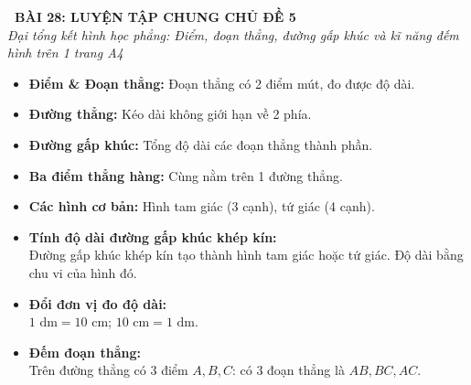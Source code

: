 \documentclass[11pt,a4paper]{article}
\begin{document}
\begin{tcolorbox}[
  enhanced,
  colback=violet!8!white,
  colframe=violet!70!black,
  arc=3mm, boxrule=1.2pt,
  left=3mm, right=3mm, top=2mm, bottom=2mm,
  halign=center
]
  {\LARGE\bfseries\color{violet!90!black}\faBookmark\ BÀI 28: LUYỆN TẬP CHUNG CHỦ ĐỀ 5}\\[1mm]
  {\itshape\footnotesize\color{black!75} Đại tổng kết hình học phẳng: Điểm, đoạn thẳng, đường gấp khúc và kĩ năng đếm hình trên 1 trang A4}
\end{tcolorbox}

\vspace{-2mm}

\noindent
\begin{minipage}[t]{0.49\textwidth}\vspace{0pt}
\begin{tcolorbox}[
  enhanced,
  colback=violet!4!white,
  colframe=violet!75!black,
  arc=2mm, boxrule=0.8pt,
  left=2mm, right=2mm, top=1.8mm, bottom=1.8mm,
  title={\footnotesize\bfseries\color{white}\faKey\ 1. Trụ cột kiến thức hình phẳng}
]
{\footnotesize
\begin{itemize}\setlength{\itemsep}{1pt}\setlength{\leftskip}{-2.5mm}
  \item \textbf{Điểm \& Đoạn thẳng:} Đoạn thẳng có 2 điểm mút, đo được độ dài.
  \item \textbf{Đường thẳng:} Kéo dài không giới hạn về 2 phía.
  \item \textbf{Đường gấp khúc:} Tổng độ dài các đoạn thẳng thành phần.
  \item \textbf{Ba điểm thẳng hàng:} Cùng nằm trên 1 đường thẳng.
  \item \textbf{Các hình cơ bản:} Hình tam giác (3 cạnh), tứ giác (4 cạnh).
\end{itemize}
}
\end{tcolorbox}
\end{minipage}
\hfill
\begin{minipage}[t]{0.49\textwidth}\vspace{0pt}
\begin{tcolorbox}[
  enhanced,
  colback=teal!4!white,
  colframe=teal!75!black,
  arc=2mm, boxrule=0.8pt,
  left=2mm, right=2mm, top=1.8mm, bottom=1.8mm,
  title={\footnotesize\bfseries\color{white}\faSliders\ 2. Kĩ năng giải toán hình học}
]
{\footnotesize
\begin{itemize}\setlength{\itemsep}{1pt}\setlength{\leftskip}{-2.5mm}
  \item \textbf{Tính độ dài đường gấp khúc khép kín:}\\
  Đường gấp khúc khép kín tạo thành hình tam giác hoặc tứ giác. Độ dài bằng chu vi của hình đó.
  \item \textbf{Đổi đơn vị đo độ dài:}\\
  $1\text{ dm} = 10\text{ cm}$; $10\text{ cm} = 1\text{ dm}$.
  \item \textbf{Đếm đoạn thẳng:}\\
  Trên đường thẳng có $3$ điểm $A, B, C$: có $3$ đoạn thẳng là $AB, BC, AC$.
\end{itemize}
}
\end{tcolorbox}
\end{minipage}
\end{document}
